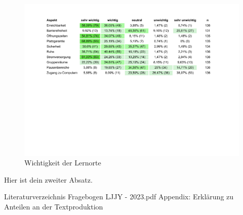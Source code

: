 \documentclass[11pt, a4paper]{article}
\begin{document}
\begin{figure}[htbp]
	\vspace*{6.8cm}
	\hspace*{-2.35cm}
	\includegraphics[scale = 0.79, trim=0.5cm 11cm 0.5cm 11cm]{Tabellen.pdf}
	\caption{Wichtigkeit der Lernorte}
\end{figure}

Hier ist dein zweiter Absatz.

\newpage
 Literaturverzeichnis
\newpage 
 {Fragebogen LJJY - 2023.pdf}
\newpage Appendix: Erklärung zu Anteilen an der Textproduktion
\end{document}
